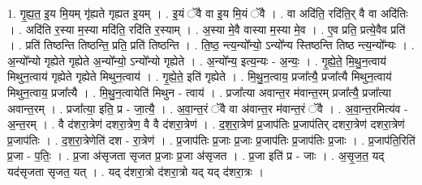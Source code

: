 \documentclass[17pt]{extarticle}
\begin{document}
1. गृ॒ह्य॒त॒ इ॒य मि॒यम् गृ॑ह्यते गृह्यत इ॒यम् । . इ॒यं ॅवै वा इ॒य मि॒यं ॅवै । . वा अदि॑ति॒ रदि॑ति॒र् वै वा अदि॑तिः । . अदि॑ति र॒स्या म॒स्या मदि॑ति॒ रदि॑ति र॒स्याम् । . अ॒स्या मे॒वै वास्या म॒स्या मे॒व । . ए॒व प्रति॒ प्रत्ये॒वैव प्रति॑ । . प्रति॑ तिष्ठन्ति तिष्ठन्ति॒ प्रति॒ प्रति॑ तिष्ठन्ति । . ति॒ष्ठ॒ न्त्य॒न्यो᳚न्यो॒ ऽन्यो᳚न्य स्तिष्ठन्ति तिष्ठ न्त्य॒न्यो᳚न्यः । . अ॒न्यो᳚न्यो गृह्येते गृह्येते अ॒न्यो᳚न्यो॒ ऽन्यो᳚न्यो गृह्येते । . अ॒न्यो᳚न्य॒ इत्य॒न्यः - अ॒न्यः॒ । . गृ॒ह्ये॒ते॒ मि॒थु॒न॒त्वाय॑ मिथुन॒त्वाय॑ गृह्येते गृह्येते मिथुन॒त्वाय॑ । . गृ॒ह्ये॒ते॒ इति॑ गृह्येते । . मि॒थु॒न॒त्वाय॒ प्रजा᳚त्यै॒ प्रजा᳚त्यै मिथुन॒त्वाय॑ मिथुन॒त्वाय॒ प्रजा᳚त्यै । . मि॒थु॒न॒त्वायेति॑ मिथुन - त्वाय॑ । . प्रजा᳚त्या अवान्त॒र म॑वान्त॒रम् प्रजा᳚त्यै॒ प्रजा᳚त्या अवान्त॒रम् । . प्रजा᳚त्या॒ इति॒ प्र - जा॒त्यै॒ । . अ॒वा॒न्त॒रं ॅवै वा अ॑वान्त॒र म॑वान्त॒रं ॅवै । . अ॒वा॒न्त॒रमित्य॑व - अ॒न्त॒रम् । . वै द॑शरा॒त्रेण॑ दशरा॒त्रेण॒ वै वै द॑शरा॒त्रेण॑ । . द॒श॒रा॒त्रेण॑ प्र॒जाप॑तिः प्र॒जाप॑तिर् दशरा॒त्रेण॑ दशरा॒त्रेण॑ प्र॒जाप॑तिः । . द॒श॒रा॒त्रेणेति॑ दश - रा॒त्रेण॑ । . प्र॒जाप॑तिः प्र॒जाः प्र॒जाः प्र॒जाप॑तिः प्र॒जाप॑तिः प्र॒जाः । . प्र॒जाप॑ति॒रिति॑ प्र॒जा - प॒तिः॒ । . प्र॒जा अ॑सृजता सृजत प्र॒जाः प्र॒जा अ॑सृजत । . प्र॒जा इति॑ प्र - जाः । . अ॒सृ॒ज॒त॒ यद् यद॑सृजता सृजत॒ यत् । . यद् द॑शरा॒त्रो द॑शरा॒त्रो यद् यद् द॑शरा॒त्रः । \newline
\end{document}

